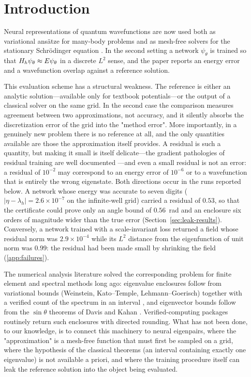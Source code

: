 \section{Introduction}
\label{sec:intro}

Neural representations of quantum wavefunctions are now used both as
variational ans\"atze for many-body problems \citep{carleo2017,hermann2020,pfau2020}
and as mesh-free solvers for the stationary Schr\"odinger equation
\citep{raissi2019,karniadakis2021}. In the second setting a network $\psi_\theta$ is trained so
that $H_h\psi_\theta\approx E\psi_\theta$ in a discrete $L^2$ sense, and the
paper reports an energy error and a wavefunction overlap against a reference
solution.

This evaluation scheme has a structural weakness. The reference is either an
analytic solution---available only for textbook potentials---or the output of
a classical solver on the same grid. In the second case the comparison
measures agreement between two approximations, not accuracy, and it silently
absorbs the discretization error of the grid into the "method error". More
importantly, in a genuinely new problem there is no reference at all, and the
only quantities available are those the approximation itself provides. A
residual is such a quantity, but making it small is itself delicate---the
gradient pathologies of residual training are well documented
\citep{wang2021}---and even a small residual is not an error: a residual of
$10^{-2}$ may correspond to an energy error of $10^{-6}$ or to a wavefunction
that is entirely the wrong eigenstate. Both directions occur in the runs
reported below. A network whose energy was accurate to seven digits
($|\eta-\lambda_h|=2.6\times10^{-7}$ on the infinite-well grid) carried a
residual of $0.53$, so that the certificate could prove only an angle bound
of $0.56$~rad and an enclosure six orders of magnitude wider than the true
error (Section~\ref{sec:leak-results}). Conversely, a network trained with a
scale-invariant loss returned a field whose residual norm was
$2.9\times10^{-4}$ while its $L^2$ distance from the eigenfunction of unit norm
was $0.99$: the residual had been made small by shrinking the field
(\ref{app:failures}).

The numerical analysis literature solved the corresponding problem for finite
element and spectral methods long ago: eigenvalue enclosures follow from
variational bounds (Weinstein, Kato--Temple, Lehmann--Goerisch) together with
a verified count of the spectrum in an interval \citep{babuska1991,parlett1998},
and eigenvector bounds follow from the $\sin\theta$ theorems of
Davis and Kahan \citep{daviskahan1970}. Verified-computing packages routinely
return such enclosures with directed rounding. What has not been done, to our
knowledge, is to connect this machinery to neural eigenpairs, where the
"approximation" is a mesh-free function that must first be sampled on a grid,
where the hypothesis of the classical theorems (an interval containing exactly
one eigenvalue) is not available a priori, and where the training procedure
itself can leak the reference solution into the object being evaluated.

